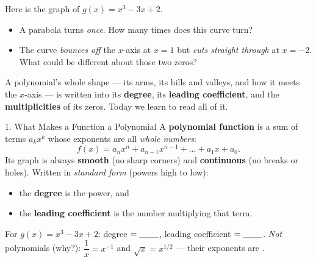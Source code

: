\documentclass[10pt]{article}
\newcommand{\lgrid}[4]{%
  \draw[step=1, linegray!40, very thin] (#1,#3) grid (#2,#4);
  \draw[->, semithick, charcoal] (#1,0)--(#2,0) node[below right, font=\scriptsize]{$x$};
  \draw[->, semithick, charcoal] (0,#3)--(0,#4) node[left, font=\scriptsize]{$y$};}
\begin{document}
\begin{hookbox}
Here is the graph of $g(x) = x^3 - 3x + 2$.
\begin{center}
\end{center}
\begin{itemize}\setlength{\itemsep}{1pt}
  \item A parabola turns \emph{once}. How many times does this curve turn? \writeline
  \item The curve \emph{bounces off} the $x$-axis at $x=1$ but \emph{cuts straight through} at $x=-2$. What could be different about those two zeros? \writeline
\end{itemize}
A polynomial's whole shape --- its arms, its hills and valleys, and how it meets the $x$-axis --- is
written into its \textbf{degree}, its \textbf{leading coefficient}, and the \textbf{multiplicities}
of its zeros. Today we learn to read all of it.
\end{hookbox}

\begin{notesbox}{1. What Makes a Function a Polynomial}
A \textbf{polynomial function} is a sum of terms $a_kx^k$ whose exponents are all \emph{whole
numbers}:
\[
  f(x) = a_nx^n + a_{n-1}x^{n-1} + \dots + a_1x + a_0 .
\]
Its graph is always \textbf{smooth} (no sharp corners) and \textbf{continuous} (no breaks or holes).
Written in \emph{standard form} (powers high to low):
\begin{itemize}[leftmargin=1.5em, itemsep=2pt]
  \item the \textbf{degree} is the \blank{3.2cm} power, and
  \item the \textbf{leading coefficient} is the number multiplying that \blank{3.6cm} term.
\end{itemize}
For $g(x)=x^3-3x+2$: degree $=\blank{0.8cm}$, leading coefficient $=\blank{0.8cm}$.
\emph{Not} polynomials (why?): $\dfrac{1}{x}=x^{-1}$ and $\sqrt{x}=x^{1/2}$ --- their exponents are
\blank{4.6cm}.
\end{notesbox}
\end{document}
